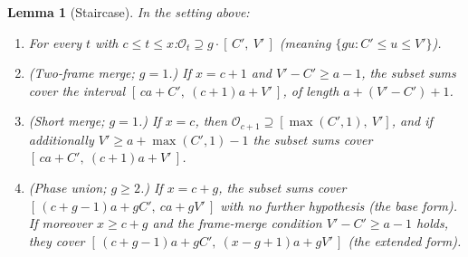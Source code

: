 \documentclass[11pt,reqno]{amsart}
\theoremstyle{plain}
\newtheorem{lemma}[theorem]{Lemma}
\theoremstyle{definition}
\theoremstyle{remark}
\begin{document}
\begin{lemma}[Staircase]\label{lem:staircase-friendly}
In the setting above:
\begin{enumerate}
\item[\textup{(a)}] For every $t$ with $c \le t \le x$:\quad $\mathcal{O}_t
      \supseteq g \cdot [\,C',\ V'\,]$ (meaning $\{g u : C' \le u \le V'\}$).
\item[\textup{(b)}] \textup{(Two-frame merge; $g = 1$.)} If $x = c + 1$ and
      $V' - C' \ge a - 1$, the subset sums cover the interval
      $[\,ca + C',\ (c+1)a + V'\,]$, of length $a + (V' - C') + 1$.
\item[\textup{(c)}] \textup{(Short merge; $g = 1$.)} If $x = c$, then
      $\mathcal{O}_{c+1} \supseteq [\max(C', 1),\ V']$, and if additionally
      $V' \ge a + \max(C', 1) - 1$ the subset sums cover
      $[\,ca + C',\ (c+1)a + V'\,]$.
\item[\textup{(d)}] \textup{(Phase union; $g \ge 2$.)} If $x = c + g$, the subset
      sums cover $[\,(c + g - 1)a + gC',\ ca + gV'\,]$ with \emph{no} further
      hypothesis (the \emph{base form}). If moreover $x \ge c + g$ and the
      \emph{frame-merge condition} $V' - C' \ge a - 1$ holds, they cover
      $[\,(c+g-1)a + gC',\ (x - g + 1)a + gV'\,]$ (the \emph{extended form}).
\end{enumerate}
\end{lemma}
\end{document}
